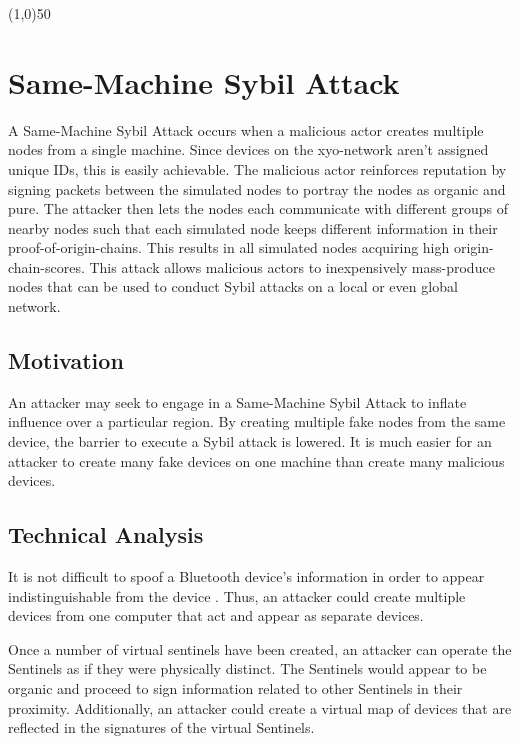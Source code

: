 \documentclass{article}
\begin{document}
\begin{center}
\line(1,0){50}
\end{center}

\section{Same-Machine Sybil Attack}
A Same-Machine Sybil Attack occurs when a malicious actor creates multiple nodes from a single machine. Since devices on the \Gls{xyo-network} aren't assigned unique IDs, this is easily achievable. The malicious actor reinforces reputation by signing packets between the simulated nodes to portray the nodes as organic and pure. The attacker then lets the nodes each communicate with different groups of nearby nodes such that each simulated node keeps different information in their \Glspl{proof-of-origin-chain}. This results in all simulated nodes acquiring high \Glspl{origin-chain-score}. This attack allows malicious actors to inexpensively mass-produce nodes that can be used to conduct Sybil attacks on a local or even global network. 

\subsection{Motivation}

An attacker may seek to engage in a Same-Machine Sybil Attack to inflate influence over a particular region. By creating multiple fake nodes from the same device, the barrier to execute a Sybil attack is lowered. It is much easier for an attacker to create many fake devices on one machine than create many malicious devices.

\subsection{Technical Analysis}

It is not difficult to spoof a Bluetooth device's information in order to appear indistinguishable from the device \cite{haxf4rall-bluetooth}. Thus, an attacker could create multiple devices from one computer that act and appear as separate devices.

Once a number of virtual \Glspl{sentinel} have been created, an attacker can operate the Sentinels as if they were physically distinct. The Sentinels would appear to be organic and proceed to sign information related to other Sentinels in their proximity. Additionally, an attacker could create a virtual map of devices that are reflected in the signatures of the virtual Sentinels.
\end{document}
